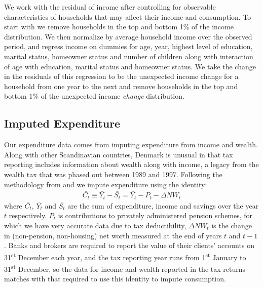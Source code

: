\documentclass[titlepage]{\econtex}\newcommand{\texname}{ConsumptionHeterogeneity}
\begin{document}
We work with the residual of income after controlling for observable characteristics of households that may affect their income and consumption. To start with we remove households in the top and bottom 1\% of the income distribution. We then normalize by average household income over the observed period, and regress income on dummies for age, year, highest level of education, marital status, homeowner status and number of children along with interaction of age with education, marital status and homeowner status. We take the change in the residuals of this regression to be the unexpected income change for a household from one year to the next and remove households in the top and bottom 1\% of the unexpected income \textit{change} distribution.

\subsection{Imputed Expenditure} \label{cons_imputation}
Our expenditure data comes from imputing expenditure from income and wealth. Along with other Scandinavian countries, Denmark is unusual in that tax reporting includes information about wealth along with income, a legacy from the wealth tax that was phased out between 1989 and 1997. Following the methodology from \cite{browning_imputing_2003} and \cite{fagereng_imputing_2015} we impute expenditure using the identity:
\begin{align*}
\bar{C_t} \equiv \bar{Y_t} - \bar{S_t} = \bar{Y_t} - P_t - \Delta NW_t 
\end{align*}
where $\bar{C_t}$, $\bar{Y_t}$ and $\bar{S_t}$  are the sum of expenditure, income and savings over the year $t$ respectively. $P_t$ is contributions to privately administered pension schemes, for which we have very accurate data due to tax deductibility, $\Delta NW_t$ is the change in (non-pension, non-housing) net worth measured at the end of years $t$ and $t-1$. Banks and brokers are required to report the value of their clients' accounts on 31\textsuperscript{st} December each year, and the tax reporting year runs from 1\textsuperscript{st} January to 31\textsuperscript{st} December, so the data for income and wealth reported in the tax returns matches with that required to use this identity to impute consumption. 
\end{document}
